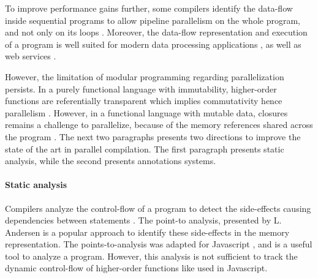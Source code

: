 To improve performance gains further, some compilers identify the data-flow inside sequential programs to allow pipeline parallelism on the whole program, and not only on its loops \cite{Beck1991, Li2012}.
Moreover, the data-flow representation and execution of a program is well suited for modern data processing applications \cite{Fernandez2014a}, as well as web services \cite{Salmito2013}.

However, the limitation of modular programming regarding parallelization persists.
In a purely functional language with immutability, higher-order functions are referentially transparent which implies commutativity hence parallelism .
However, in a functional language with mutable data, closures remains a challenge to parallelize, because of the memory references shared across the program \cite{Harrison1989, Nicolay2010, Matsakis2012a}.
The next two paragraphs presents two directions to improve the state of the art in parallel compilation.
The first paragraph presents static analysis, while the second presents annotations systems.




\paragraph{Static analysis}


Compilers analyze the control-flow of a program to detect the side-effects causing dependencies between statements \cite{Allen1970}.
The point-to analysis, presented by L. Andersen \cite{Andersen1994} is a popular approach to identify these side-effects in the memory representation.
The points-to-analysis was adapted for Javascript \cite{Jang2009,Sridharan2012,Wei2014}, and is a useful tool to analyze a program.
However, this analysis is not sufficient to track the dynamic control-flow of higher-order functions \cite{Shivers1991} like used in Javascript.


